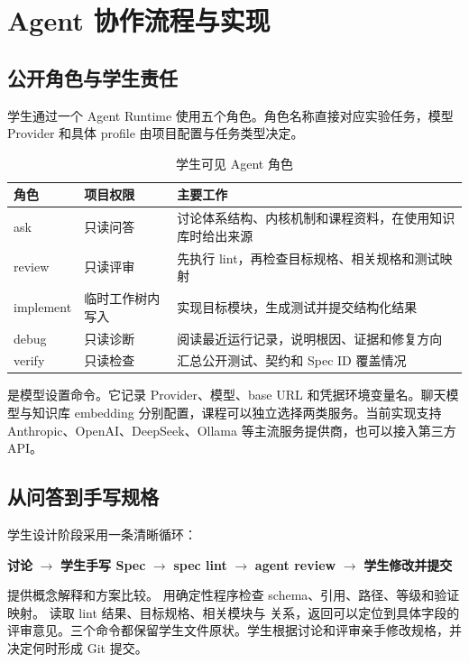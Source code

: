 \chapter{Agent 协作流程与实现}

\section{公开角色与学生责任}

学生通过一个 Agent Runtime 使用五个角色。角色名称直接对应实验任务，模型 Provider 和具体 profile 由项目配置与任务类型决定。

\begin{table}[htbp]
  \centering
  \caption{学生可见 Agent 角色}
  \label{tab:agent-roles}
  \begin{tabularx}{\textwidth}{p{2.5cm}p{3.0cm}X}
    \toprule
    角色 & 项目权限 & 主要工作 \\
    \midrule
    ask & 只读问答 & 讨论体系结构、内核机制和课程资料，在使用知识库时给出来源 \\
    review & 只读评审 & 先执行 lint，再检查目标规格、相关规格和测试映射 \\
    implement & 临时工作树内写入 & 实现目标模块，生成测试并提交结构化结果 \\
    debug & 只读诊断 & 阅读最近运行记录，说明根因、证据和修复方向 \\
    verify & 只读检查 & 汇总公开测试、契约和 Spec ID 覆盖情况 \\
    \bottomrule
  \end{tabularx}
\end{table}

 是模型设置命令。它记录 Provider、模型、base URL 和凭据环境变量名。聊天模型与知识库 embedding 分别配置，课程可以独立选择两类服务。当前实现支持 Anthropic、OpenAI、DeepSeek、Ollama 等主流服务提供商，也可以接入第三方 API。

\section{从问答到手写规格}

学生设计阶段采用一条清晰循环：

\begin{center}
\textbf{讨论} $\rightarrow$ \textbf{学生手写 Spec} $\rightarrow$ \textbf{spec lint} $\rightarrow$ \textbf{agent review} $\rightarrow$ \textbf{学生修改并提交}
\end{center}

 提供概念解释和方案比较。 用确定性程序检查 schema、引用、路径、等级和验证映射。 读取 lint 结果、目标规格、相关模块与  关系，返回可以定位到具体字段的评审意见。三个命令都保留学生文件原状。学生根据讨论和评审亲手修改规格，并决定何时形成 Git 提交。

